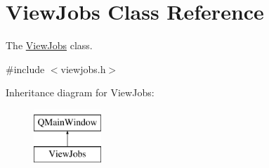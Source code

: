 \hypertarget{class_view_jobs}{}\section{View\+Jobs Class Reference}
\label{class_view_jobs}


The \hyperlink{class_view_jobs}{View\+Jobs} class.  




{\ttfamily \#include $<$viewjobs.\+h$>$}

Inheritance diagram for View\+Jobs\+:\begin{figure}[H]
\begin{center}
\leavevmode
\includegraphics[height=2.000000cm]{class_view_jobs}
\end{center}
\end{figure}
